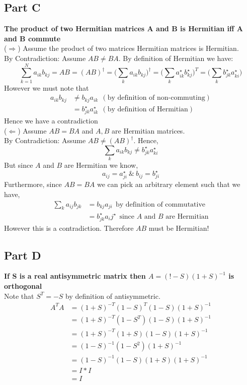 \documentclass[10pt,a4paper]{article}
\begin{document}
	\subsection{Part C}
	\textbf{The product of two Hermitian matrices A and B is Hermitian iff A and B commute}\\
	($\Rightarrow$) Assume the product of two matrices Hermitian matrices is Hermitian. \\
	By Contradiction: Assume $AB\neq BA$. By definition of Hermitian we have:
	$$\sum_{k=1}^{N}a_{ik}b_{kj}  = AB = (AB)^{\dagger} = \Big(\sum_k a_{ik}b_{kj}  \Big)^\dagger  = \Big(\sum_k a_{ik}^\star b_{kj}^\star  \Big)^T = \Big( \sum_k b^\star_{jk}a^\star_{ki} \Big)$$
	However we must note that 
	\begin{equation}
	\nonumber
		\begin{split}
		a_{ik}b_{kj} &\neq b_{kj}a_{ik}  \ \  (\text{by definition of non-commuting})\\
		& = b^\star_{jk}a^\star_{ik} \ \ (\text{by definition of Hermitian})
		\end{split}
	\end{equation}
	Hence we have a contradiction
	\\
	($\Leftarrow$) Assume $AB=BA$ and $A,B$ are Hermitian matrices. \\
	By Contradiction: Assume $AB \neq (AB)^\dagger$. Hence, $$\sum_k a_{ik}b_{kj} \neq b_{jk}^\star a_{ki}^\star $$
	But since $A$ and $B$ are Hermitian we know,
	 $$a_{ij}=a_{ji}^\star  \ \& \  b_{ij}=b_{ji}^\star $$
	Furthermore, since $AB=BA$ we can pick an arbitrary element such that we have,
	\begin{equation}
	\begin{split}
		\sum_k a_{ij}b_{jk} & = b_{kj}a_{ji} \ \ \text{by definition of commutative}\\
		& = b_{jk}^\star a{_ij}^\star \ \ \text{since $A$ and $B$ are Hermitian} 
	\end{split}
	\end{equation}
	However this is a contradiction. Therefore $AB$ must be Hermitian!
	
	\subsection{Part D}
	\textbf{If S is a real antisymmetric matrix then $A=(!-S)(1+S)^{-1}$ is orthogonal}\\
	Note that $S^T = -S$ by definition of antisymmetric.
	\begin{equation}
	\nonumber
		\begin{split}
			A^TA &= (1+S)^{-T}(1-S)^{T}(1-S)(1+S)^{-1}\\
			&= (1+S)^{-T}(1-S^T)(1-S)(1+S)^{-1}\\
			&= (1+S)^{-T}(1+S)(1-S)(1+S)^{-1}\\
			&= (1-S)^{-1}(1-S^2)(1+S)^{-1}\\
			&= (1-S)^{-1}(1-S)(1+S)(1+S)^{-1}\\
			&= I * I\\
			&= I 
		\end{split}
	\end{equation}
	
\end{document}
